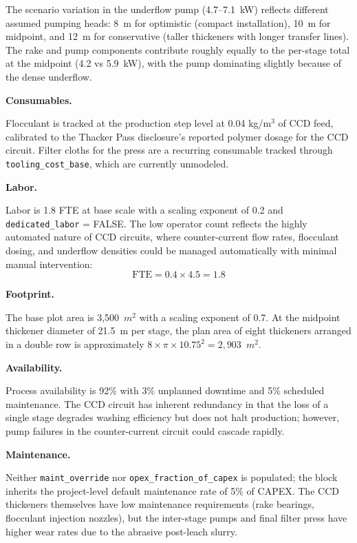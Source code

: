 \noindent The scenario variation in the underflow pump (4.7--7.1~kW) reflects different assumed pumping heads: 8~m for optimistic (compact installation), 10~m for midpoint, and 12~m for conservative (taller thickeners with longer transfer lines). The rake and pump components contribute roughly equally to the per-stage total at the midpoint (4.2 vs 5.9~kW), with the pump dominating slightly because of the dense underflow.

\medskip
\noindent\textbf{Consumables.}\quad

Flocculant is tracked at the production step level at 0.04 kg/m$^3$ of CCD feed, calibrated to the Thacker Pass disclosure's reported polymer dosage for the CCD circuit. Filter cloths for the press are a recurring consumable tracked through \texttt{tooling\_cost\_base}, which are currently unmodeled.

\medskip
\noindent\textbf{Labor.}\quad

Labor is 1.8 FTE at base scale with a scaling exponent of 0.2 and \texttt{dedicated\_labor} = FALSE. The low operator count reflects the highly automated nature of CCD circuits, where counter-current flow rates, flocculant dosing, and underflow densities could be managed automatically with minimal manual intervention:
\[
	\text{FTE} = 0.4 \times 4.5 = 1.8
\]

\medskip
\noindent\textbf{Footprint.}\quad

The base plot area is 3,500~$\si{m^2}$ with a scaling exponent of 0.7. At the midpoint thickener diameter of 21.5~m per stage, the plan area of eight thickeners arranged in a double row is approximately $8 \times \pi \times 10.75^2 = 2,903$~$\si{m^2}$.

\medskip
\noindent\textbf{Availability.}\quad

Process availability is 92\% with 3\% unplanned downtime and 5\% scheduled maintenance. The CCD circuit has inherent redundancy in that the loss of a single stage degrades washing efficiency but does not halt production; however, pump failures in the counter-current circuit could cascade rapidly.

\medskip
\noindent\textbf{Maintenance.}\quad

Neither \texttt{maint\_override} nor \texttt{opex\_fraction\_of\_capex} is populated; the block inherits the project-level default maintenance rate of 5\% of CAPEX. The CCD thickeners themselves have low maintenance requirements (rake bearings, flocculant injection nozzles), but the inter-stage pumps and final filter press have higher wear rates due to the abrasive post-leach slurry.

